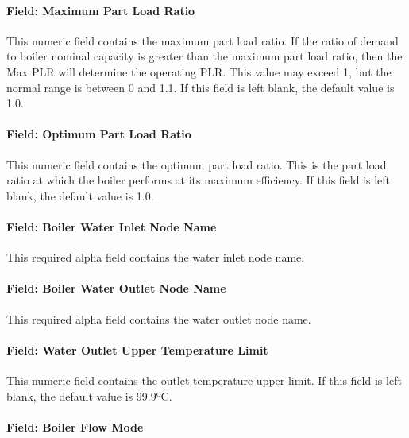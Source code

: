 \paragraph{Field: Maximum Part Load Ratio}\label{field-maximum-part-load-ratio-9}

This numeric field contains the maximum part load ratio. If the ratio of demand to boiler nominal capacity is greater than the maximum part load ratio, then the Max PLR will determine the operating PLR. This value may exceed 1, but the normal range is between 0 and 1.1. If this field is left blank, the default value is 1.0.

\paragraph{Field: Optimum Part Load Ratio}\label{field-optimum-part-load-ratio-9}

This numeric field contains the optimum part load ratio. This is the part load ratio at which the boiler performs at its maximum efficiency. If this field is left blank, the default value is 1.0.

\paragraph{Field: Boiler Water Inlet Node Name}\label{field-boiler-water-inlet-node-name}

This required alpha field contains the water inlet node name.

\paragraph{Field: Boiler Water Outlet Node Name}\label{field-boiler-water-outlet-node-name}

This required alpha field contains the water outlet node name.

\paragraph{Field: Water Outlet Upper Temperature Limit}\label{field-water-outlet-upper-temperature-limit-000}

This numeric field contains the outlet temperature upper limit. If this field is left blank, the default value is 99.9ºC.

\paragraph{Field: Boiler Flow Mode}\label{field-boiler-flow-mode}

